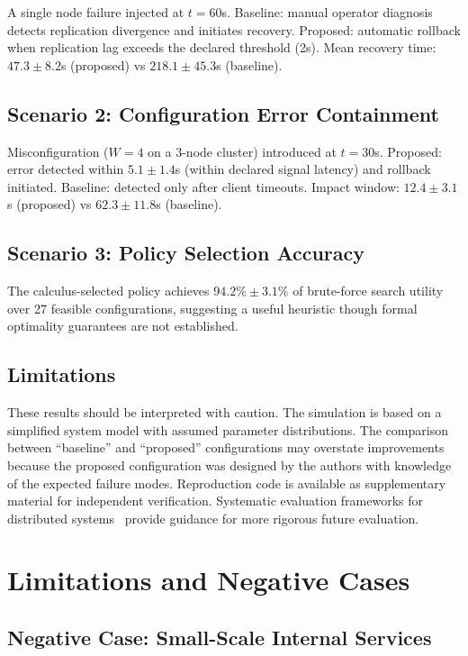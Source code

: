 \documentclass[conference]{IEEEtran}
\begin{document}
A single node failure injected at $t=60$s. Baseline: manual operator diagnosis detects replication divergence and initiates recovery. Proposed: automatic rollback when replication lag exceeds the declared threshold (2s). Mean recovery time: $47.3 \pm 8.2$s (proposed) vs $218.1 \pm 45.3$s (baseline).

\subsection{Scenario 2: Configuration Error Containment}

Misconfiguration ($W=4$ on a 3-node cluster) introduced at $t=30$s. Proposed: error detected within $5.1 \pm 1.4$s (within declared signal latency) and rollback initiated. Baseline: detected only after client timeouts. Impact window: $12.4 \pm 3.1$s (proposed) vs $62.3 \pm 11.8$s (baseline).

\subsection{Scenario 3: Policy Selection Accuracy}

The calculus-selected policy achieves $94.2\% \pm 3.1\%$ of brute-force search utility over 27 feasible configurations, suggesting a useful heuristic though formal optimality guarantees are not established.

\subsection{Limitations}

These results should be interpreted with caution. The simulation is based on a simplified system model with assumed parameter distributions. The comparison between ``baseline'' and ``proposed'' configurations may overstate improvements because the proposed configuration was designed by the authors with knowledge of the expected failure modes. Reproduction code is available as supplementary material for independent verification. Systematic evaluation frameworks for distributed systems~\cite{gherghe2025framework} provide guidance for more rigorous future evaluation.

\section{Limitations and Negative Cases}

\subsection{Negative Case: Small-Scale Internal Services}
\end{document}
